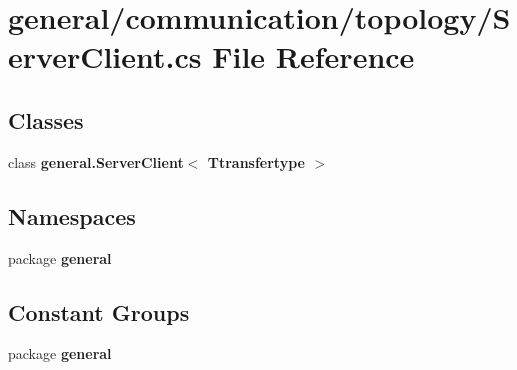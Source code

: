 \section{general/communication/topology/\-Server\-Client.cs File Reference}
\label{_server_client_8cs}
\subsection*{Classes}
\begin{DoxyCompactItemize}
\item 
class {\bf general.\-Server\-Client$<$ Ttransfertype $>$}
\end{DoxyCompactItemize}
\subsection*{Namespaces}
\begin{DoxyCompactItemize}
\item 
package {\bf general}
\end{DoxyCompactItemize}
\subsection*{Constant Groups}
\begin{DoxyCompactItemize}
\item 
package {\bf general}
\end{DoxyCompactItemize}

